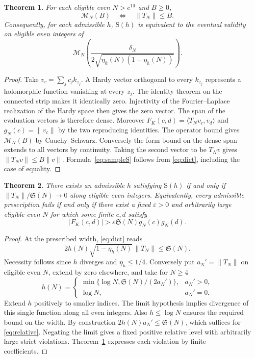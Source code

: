 \documentclass[11pt,a4paper]{article}
\newtheorem{theorem}{Theorem}[section]
\newcommand{\SSg}{\mathfrak S}
\begin{document}
\begin{theorem}\label{th:samples}
For each eligible even $N>e^{10}$ and $B\ge0$,
\[
 \mathcal M_N(B)\quad\Longleftrightarrow\quad \|T_N\|\le B .
\]
Consequently, for each admissible $h$, $\mathrm S(h)$ is equivalent to the eventual validity on eligible even integers of
\begin{equation}\label{eq:sampleS}
 \mathcal M_N\!\left(\frac{\delta_N}{2\sqrt{\eta_h(N)(1-\eta_h(N))}}\right).
\end{equation}
\end{theorem}
\begin{proof}
Take $v_c=\sum_j c_j k_{z_j}$. A Hardy vector orthogonal to every $k_{z_j}$ represents a holomorphic function vanishing at every $z_j$. The identity theorem on the connected strip makes it identically zero. Injectivity of the Fourier--Laplace realization of the Hardy space then gives the zero vector. The span of the evaluation vectors is therefore dense. Moreover
$F_K(c,d)=\langle T_Nv_c,v_d\rangle$ and $g_N(c)=\|v_c\|$ by the two reproducing identities. The operator bound gives $\mathcal M_N(B)$ by Cauchy--Schwarz. Conversely the form bound on the dense span extends to all vectors by continuity. Taking the second vector to be $T_Nv$ gives $\|T_Nv\|\le B\|v\|$. Formula~\eqref{eq:sampleS} follows from \eqref{eq:dict}, including the case of equality.
\end{proof}

\begin{theorem}\label{th:exist}
There exists an admissible $h$ satisfying $\mathrm S(h)$ if and only if
$\|T_N\|/\SSg(N)\to0$ along eligible even integers. Equivalently, every admissible prescription fails if and only if there exist a fixed $\varepsilon>0$ and arbitrarily large eligible even $N$ for which some finite $c,d$ satisfy
\[
             |F_K(c,d)|>\varepsilon\SSg(N)g_N(c)g_N(d).
\]
\end{theorem}
\begin{proof}
At the prescribed width, \eqref{eq:dict} reads
\begin{equation}\label{eq:relative}
   2h(N)\sqrt{1-\eta_h(N)}\,\|T_N\|\le\SSg(N).
\end{equation}
Necessity follows since $h$ diverges and $\eta_h\le1/4$. Conversely put $a_N'=\|T_N\|$ on eligible even $N$, extend by zero elsewhere, and take for $N\ge4$
\[
 h(N)=
 \begin{cases}
 \min\{\log N,\SSg(N)/(2a_N')\},&a_N'>0,\\
 \log N,&a_N'=0 .
 \end{cases}
\]
Extend $h$ positively to smaller indices. The limit hypothesis implies divergence of this single function along all even integers. Also $h\le\log N$ ensures the required bound on the width. By construction $2h(N)a_N'\le\SSg(N)$, which suffices for \eqref{eq:relative}. Negating the limit gives a fixed positive relative level with arbitrarily large strict violations. Theorem~\ref{th:samples} expresses each violation by finite coefficients.
\end{proof}
\end{document}
